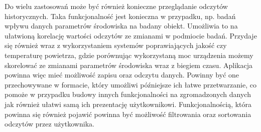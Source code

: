 Do wielu zastosowań może być również konieczne przeglądanie odczytów historycznych.
Taka funkcjonalność jest konieczna w przypadku, np. badań wpływu danych
parametrów środowiska na badany obiekt. Umożliwia to na ułatwioną korelację
wartości odczytów ze zmianami w podmiocie badań. Przydaje się również 
wraz z wykorzystaniem systemów poprawiających jakość czy temperaturę
powietrza, gdzie porównując wykorzystaną moc urządzenia możemy skorelować
ze zmianami parametrów środowiska wraz z biegiem czasu.
Aplikacja powinna więc mieć możliwość zapisu oraz odczytu danych. Powinny być
one przechowywane w formacie, który umożliwi późniejsze ich łatwe przetwarzanie,
co pomoże w przypadku budowy innych funkcjonalności na zgromadzonych danych
jak również ułatwi samą ich prezentację użytkownikowi. Funkcjonalnością, która
powinna się również pojawić powinna być możliwość filtrowania oraz sortowania
odczytów przez użytkownika.

